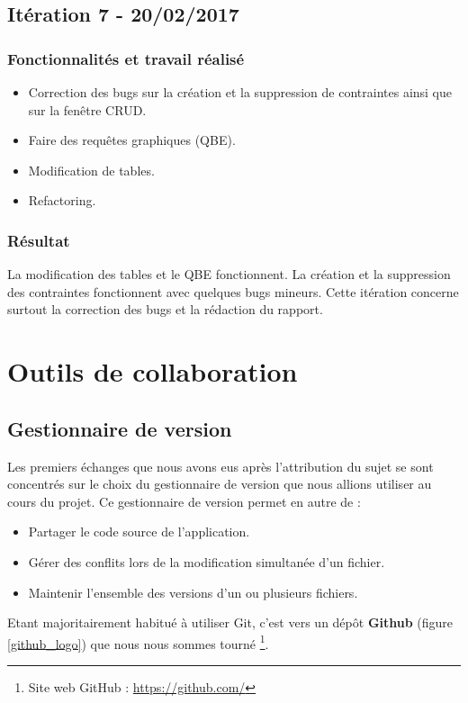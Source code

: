 \subsection{Itération 7 - 20/02/2017}
\subsubsection{Fonctionnalités et travail réalisé}
\begin{itemize}
\item Correction des bugs sur la création et la suppression de contraintes ainsi que sur la fenêtre CRUD.
\item Faire des requêtes graphiques (QBE).
\item Modification de tables.
\item Refactoring.
\end{itemize}

\subsubsection{Résultat}

La modification des tables et le QBE fonctionnent.
La création et la suppression des contraintes fonctionnent avec quelques bugs mineurs.
Cette itération concerne surtout la correction des bugs et la rédaction du rapport. 


\section{Outils de collaboration}

\subsection{Gestionnaire de version}
Les premiers échanges que nous avons eus après l'attribution du sujet se sont concentrés sur le choix du gestionnaire de version que nous allions utiliser au cours du projet. Ce gestionnaire de version permet en autre de :
\begin{itemize}
\item Partager le code source de l'application.
\item Gérer des conflits lors de la modification simultanée d'un fichier.
\item Maintenir l'ensemble des versions d'un ou plusieurs fichiers.\\
\end{itemize}

Etant majoritairement habitué à utiliser Git, c'est vers un dép\^ot \textbf{Github} (figure \ref{github_logo}) que nous nous sommes tourné
\footnote{Site web GitHub : \url{https://github.com/}}.

